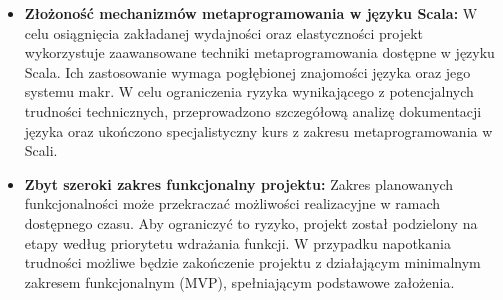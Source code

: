 \begin{itemize}
    \item \textbf{Złożoność mechanizmów metaprogramowania w języku Scala:}
    W celu osiągnięcia zakładanej wydajności oraz elastyczności projekt wykorzystuje zaawansowane techniki metaprogramowania dostępne w języku Scala. Ich zastosowanie wymaga pogłębionej znajomości języka oraz jego systemu makr. W celu ograniczenia ryzyka wynikającego z potencjalnych trudności technicznych, przeprowadzono szczegółową analizę dokumentacji języka oraz ukończono specjalistyczny kurs z zakresu metaprogramowania w Scali\cite{scala-course}.
    
    \item \textbf{Zbyt szeroki zakres funkcjonalny projektu:}
    Zakres planowanych funkcjonalności może przekraczać możliwości realizacyjne w ramach dostępnego czasu. Aby ograniczyć to ryzyko, projekt został podzielony na etapy według priorytetu wdrażania funkcji. W przypadku napotkania trudności możliwe będzie zakończenie projektu z działającym minimalnym zakresem funkcjonalnym (MVP), spełniającym podstawowe założenia.
\end{itemize}

